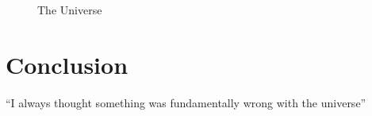 \documentclass{article}
\begin{document}
\begin{figure}[h!]
\centering

\caption{The Universe}
\label{fig:universe}
\end{figure}

\section{Conclusion}
``I always thought something was fundamentally wrong with the universe'' \citep{adams1995hitchhiker}



\end{document}
